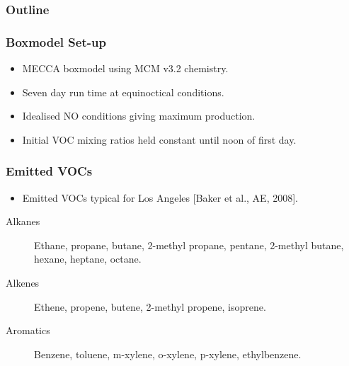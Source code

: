 \begin{frame}
    \frametitle{Outline} 
    \begin{flushleft}
        \tableofcontents[currentsection]
    \end{flushleft}
\end{frame} 

\begin{frame}
    \frametitle{Boxmodel Set-up}

    \begin{itemize}
        \item MECCA boxmodel using MCM v3.2 chemistry. \vspace{3mm}
        \item Seven day run time at equinoctical conditions. \vspace{3mm}
        \item Idealised NO conditions giving maximum  production. \vspace{3mm}
        \item Initial VOC mixing ratios held constant until noon of first day.
    \end{itemize}
\end{frame}

\begin{frame}
    \frametitle{Emitted VOCs}
    \vspace{-2mm}

    \begin{itemize}
        \item Emitted VOCs typical for Los Angeles [Baker et al., AE, 2008].
    \end{itemize}
    \vspace{3mm}

    \begin{description}
        \item[Alkanes] Ethane, propane, butane, 2-methyl propane, pentane, 2-methyl butane, hexane, heptane, octane. 
        \item[Alkenes] Ethene, propene, butene, 2-methyl propene, isoprene. 
        \item[Aromatics] Benzene, toluene, m-xylene, o-xylene, p-xylene, ethylbenzene. 
    \end{description}
\end{frame}

